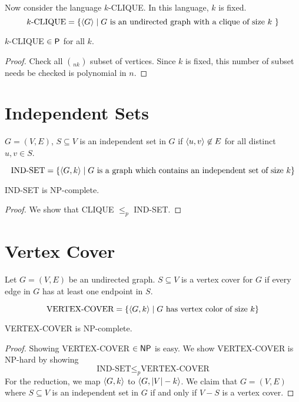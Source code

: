 Now consider the language $k$-CLIQUE. In this language, $k$ is fixed.
$$
\text{$k$-CLIQUE} = \{ \langle G \rangle \mid \text{$G$ is an undirected graph with a clique of size $k$ }\}
$$
\begin{theorem}
    $k$-CLIQUE $\in \mathsf{P}$ for all $k$.
\end{theorem}

\begin{proof}
    Check all $\choose{n k}$ subset of vertices. Since $k$ is fixed, this number of subset needs be checked is polynomial in $n$.
\end{proof}

\section{Independent Sets}

$G=(V,E)$, $S \subseteq V$ is an independent set in $G$ if $\langle u,v \rangle\not\in E$ for all distinct $u,v \in S$.

$$
\text{IND-SET} = \{\langle G,k \rangle \mid \text{$G$ is a graph which contains an independent set of size $k$}\}
$$

\begin{theorem}
    IND-SET is NP-complete.
\end{theorem}

\begin{proof}
    We show that CLIQUE $\leq_p$ IND-SET.
\end{proof}

\section{Vertex Cover}

Let $G=(V,E)$ be an undirected graph. $S \subseteq V$ is a vertex cover for $G$ if every edge in $G$ has at least one endpoint in $S$.

$$
\text{VERTEX-COVER} = \{ \langle G,k \rangle \mid \text{$G$ has vertex color of size $k$}\}
$$

\begin{theorem}
    VERTEX-COVER is NP-complete.
\end{theorem}

\begin{proof}
    Showing VERTEX-COVER $\in \mathsf{NP}$ is easy. We show VERTEX-COVER is NP-hard by showing
    $$
    \text{IND-SET} \leq_p \text{VERTEX-COVER}
    $$
    For the reduction, we map $\langle G,k \rangle$ to $\langle G,|V|-k \rangle$. We claim that $G=(V,E)$ where $S \subseteq V$ is an independent set in $G$ if and only if $V-S$ is a vertex cover.
\end{proof}

